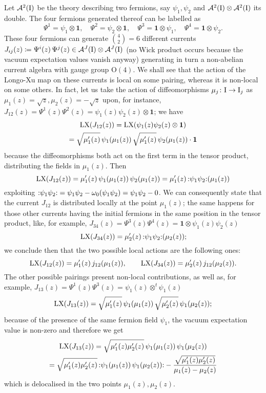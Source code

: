  \begin{example}
 Let $\mathcal{A}^2(\textrm{I})$ be the theory describing two fermions,
 say $\psi_1,\psi_2$ and $\mathcal{A}^2(\textrm{I})\otimes
 \mathcal{A}^2(\textrm{I})$ its double. The four fermions generated 
 thereof can be labelled as 
 \[
 \Psi^1=\psi_1\otimes\bm{1},\quad \Psi^2=\psi_2\otimes\bm{1},
 \quad \Psi^3=\bm{1}\otimes\psi_1,\quad
 \Psi^4=\bm{1}\otimes\psi_2.
 \]
 These four fermions can generate $\binom{4}{2}=6$ different 
 currents $J_{ij}(z)\coloneqq \Psi^i(z)\,\Psi^j(z)\in
 \mathcal{A}^J(\textrm{I})\otimes\mathcal{A}^J(\textrm{I})$ (no Wick product
 occurs because the vacuum expectation values vanish anyway) 
 generating in turn a non-abelian current algebra 
 with gauge group $\textrm{O}(4)$. We shall see that the 
 action of the Longo-Xu map on these currents is local 
 on some pairing, whereas it is non-local on some 
 others. In fact, let us take the action of 
 diffeomorphisms $\mu_j\colon \textrm{I}\to\textrm{I}_j$ as 
 $\mu_1(z)=\sqrt{z},\mu_2(z)=-\sqrt{z}$ upon, 
 for instance,
 $J_{12}(z)=\Psi^1(z)\Psi^2(z)=
 \psi_1(z)\psi_2(z)\otimes\bm{1}$; we have 
 \begin{multline*}
 \textrm{LX}(J_{12}(z))=\textrm{LX}(\psi_1(z)\psi_2(z)\otimes\bm{1})\\=
 \sqrt{\mu_1'(z)}\,\psi_1(\mu_1(z))\,
 \sqrt{\mu_1'(z)}\,\psi_2(\mu_1(z))\cdot\bm{1}
 \end{multline*}
 because the diffeomorphisms both act on the first 
 term in the tensor product, distributing the fields
 in $\mu_1(z)$. Then
 \[
 \LX(J_{12}(z))=\mu_1'(z)\,\psi_1(\mu_1(z))\,
 \psi_2(\mu_1(z))=\mu_1'(z)\,\wick{\psi_1\psi_2}(\mu_1(z))
 \]
 exploiting $\wick{\psi_1\psi_2}=\psi_1\psi_2-\vac(
 \psi_1\psi_2)=\psi_1\psi_2-0$. We can consequently 
 state that the current $J_{12}$ is distributed 
 locally at the point $\mu_1(z)$; the same happens
 for those other currents having the initial fermions
 in the same position in the tensor product, like, for 
 example, $J_{34}(z)=\Psi^3(z)\Psi^4(z)=\bm{1}\otimes 
 \psi_1(z)\psi_2(z)$
 \[
 \LX(J_{34}(z))=\mu_2'(z)\,
 \wick{\psi_1\psi_2}(\mu_2(z));
 \]
 we conclude then that the two possible local actions 
 are the following ones:
 \[
 \textrm{LX}(J_{12}(z))=\mu_1'(z)\,j_{12}(\mu_1(z)),\qquad 
 \textrm{LX}(J_{34}(z))=\mu_2'(z)\,j_{12}(\mu_2(z)).
 \]
 The other possible pairings present non-local 
 contributions, as well as, for example, 
 $J_{13}(z)=\Psi^1(z)\Psi^3(z)=\psi_1(z)\otimes^t 
 \psi_1(z)$
 \[
 \textrm{LX}(J_{13}(z))=\sqrt{\mu_1'(z)}\,\psi_1(\mu_1(z))
 \,\sqrt{\mu_2'(z)}\,\psi_1(\mu_2(z));
 \]
 because of the presence of the same fermion field 
 $\psi_1$, the vacuum expectation value is non-zero 
 and therefore we get
 \begin{multline*}
 \LX(J_{13}(z))=\sqrt{\mu_1'(z)\mu_2'(z)}\,\psi_1(\mu_1(z))
 \,\psi_1(\mu_2(z))\\
 =\sqrt{\mu_1'(z)\mu_2'(z)}\,\wick{\psi_1(\mu_1(z))\,
 \psi_1(\mu_2(z))}-\frac{\sqrt{\mu_1'(z)\mu_2'(z)}}
 {\mu_1(z)-\mu_2(z)}
 \end{multline*}
 which is delocalised in the two points 
 $\mu_1(z),\mu_2(z)$.
 

\end{example}
